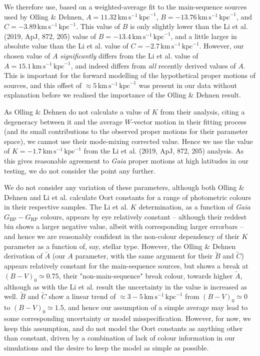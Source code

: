 \documentclass[fleqn,usenatbib]{mnras}
\begin{document}
We therefore use, based on a weighted-average fit to the main-sequence sources used by Olling \& Dehnen, $A = 11.32\,\mathrm{km}\,\mathrm{s}^{-1}\,\mathrm{kpc}^{-1}$, $B = -13.76\,\mathrm{km}\,\mathrm{s}^{-1}\,\mathrm{kpc}^{-1}$, and $C = -3.89\,\mathrm{km}\,\mathrm{s}^{-1}\,\mathrm{kpc}^{-1}$.
This value of $B$ is only slightly lower than the Li et al. (2019, ApJ, 872, 205) value of $B = -13.4\,\mathrm{km}\,\mathrm{s}^{-1}\,\mathrm{kpc}^{-1}$, and a little larger in absolute value than the Li et al. value of $C = -2.7\,\mathrm{km}\,\mathrm{s}^{-1}\,\mathrm{kpc}^{-1}$.
However, our chosen value of $A$ \textit{significantly} differs from the Li et al. value of $A = 15.1\,\mathrm{km}\,\mathrm{s}^{-1}\,\mathrm{kpc}^{-1}$, and indeed differs from \textit{all} recently derived values of $A$.
This is important for the forward modelling of the hypothetical proper motions of sources, and this offset of $\approx5\,\mathrm{km}\,\mathrm{s}^{-1}\,\mathrm{kpc}^{-1}$ was present in our data without explanation before we realised the importance of the Olling \& Dehnen result.

As Olling \& Dehnen do not calculate a value of $K$ from their analysis, citing a degeneracy between it and the average $W$-vector motion in their fitting process (and its small contributions to the observed proper motions for their parameter space), we cannot use their mode-mixing corrected value.
Hence we use the value of $K = -1.7\,\mathrm{km}\,\mathrm{s}^{-1}\,\mathrm{kpc}^{-1}$ from the Li et al. (2019, ApJ, 872, 205) analysis.
As this gives reasonable agreement to \textit{Gaia} proper motions at high latitudes in our testing, we do not consider the point any further.

We do not consider any variation of these parameters, although both Olling \& Dehnen and Li et al. calculate Oort constants for a range of photometric colours in their respective samples.
The Li et al. $K$ determination, as a function of \textit{Gaia} $G_\mathrm{BP} - G_\mathrm{RP}$ colours, appears by eye relatively constant -- although their reddest bin shows a larger negative value, albeit with corresponding larger errorbars -- and hence we are reasonably confident in the non-colour dependency of their $K$ parameter as a function of, say, stellar type.
However, the Olling \& Dehnen derivation of $\widetilde{A}$ (our $A$ parameter, with the same argument for their $\widetilde{B}$ and $\widetilde{C}$) appears relatively constant for the main-sequence sources, but shows a break at $(B - V)_0 \simeq 0.75$, their "non-main-sequence" break colour, towards higher $\widetilde{A}$, although as with the Li et al. result the uncertainty in the value is increased as well.
$\widetilde{B}$ and $\widetilde{C}$ show a linear trend of $\approx 3-5\,\mathrm{km}\,\mathrm{s}^{-1}\,\mathrm{kpc}^{-1}$ from $(B - V)_0 \simeq 0$ to $(B - V)_0 \simeq 1.5$, and hence our assumption of a simple average may lead to some corresponding uncertainty or model misspecification.
However, for now, we keep this assumption, and do not model the Oort constants as anything other than constant, driven by a combination of lack of colour information in our simulations and the desire to keep the model as simple as possible.
\end{document}
